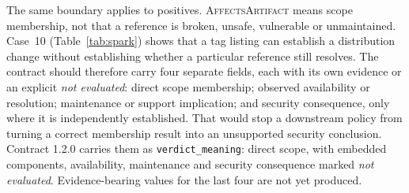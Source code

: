 \documentclass[11pt,a4paper]{article}
\newcommand{\code}[1]{\texttt{#1}}
\begin{document}
The same boundary applies to positives. \textsc{AffectsArtifact} means
scope membership, not that a reference is broken, unsafe, vulnerable or
unmaintained. Case~10 (Table~\ref{tab:spark}) shows that a tag listing
can establish a distribution change without establishing whether a
particular reference still resolves. The contract should therefore
carry four separate fields, each with its own evidence or an explicit
\emph{not evaluated}: direct scope membership; observed availability or
resolution; maintenance or support implication; and security
consequence, only where it is independently established. That would
stop a downstream policy from turning a correct membership result into
an unsupported security conclusion. Contract 1.2.0 carries them as
\code{verdict\_meaning}: direct scope, with embedded
components, availability, maintenance and security consequence marked
\emph{not evaluated}. Evidence-bearing values for the last four are not
yet produced.
\end{document}
